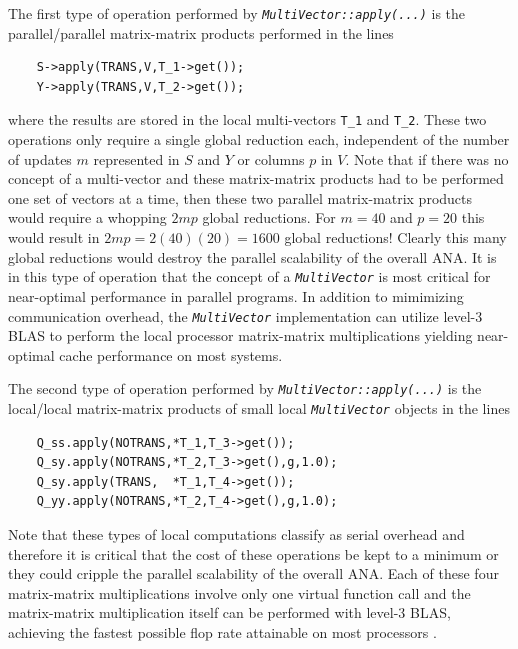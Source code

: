 The first type of operation performed by
\texttt{\textit{Multi\-Vector\-::apply(\-...)}} is the parallel/parallel
matrix-matrix products performed in the lines

{\scriptsize\begin{verbatim}
    S->apply(TRANS,V,T_1->get());
    Y->apply(TRANS,V,T_2->get());
\end{verbatim}}

\noindent where the results are stored in the local multi-vectors 
\texttt{T\_1} and \texttt{T\_2}.  These two operations only
require a single global reduction each, independent of the number of
updates $m$ represented in $S$ and $Y$ or columns $p$ in $V$.  Note
that if there was no concept of a multi-vector and these matrix-matrix
products had to be performed one set of vectors at a time, then these
two parallel matrix-matrix products would require a whopping $2 m p$
global reductions.  For $m = 40$ and $p = 20$ this would result in $2
m p = 2(40)(20) = 1600$ global reductions!  Clearly this many global
reductions would destroy the parallel scalability of the overall ANA.
It is in this type of operation that the concept of a
\texttt{\textit{Multi\-Vector}} is most critical for near-optimal
performance in parallel programs.  In addition to mimimizing
communication overhead, the \texttt{\textit{Multi\-Vector}}
implementation can utilize level-3 BLAS to perform the local processor
matrix-matrix multiplications yielding near-optimal cache performance
on most systems.

The second type of operation performed by
\texttt{\textit{Multi\-Vector\-::apply(\-...)}} is the local/local matrix-matrix
products of small local \texttt{\textit{Multi\-Vector}} objects in the
lines

{\scriptsize\begin{verbatim}
    Q_ss.apply(NOTRANS,*T_1,T_3->get());
    Q_sy.apply(NOTRANS,*T_2,T_3->get(),g,1.0);
    Q_sy.apply(TRANS,  *T_1,T_4->get());
    Q_yy.apply(NOTRANS,*T_2,T_4->get(),g,1.0);
\end{verbatim}}

\noindent Note that these types of local computations classify as serial
overhead and therefore it is critical that the cost of these
operations be kept to a minimum or they could cripple the parallel
scalability of the overall ANA.  Each of these four matrix-matrix
multiplications involve only one virtual function call and the
matrix-matrix multiplication itself can be performed with level-3
BLAS, achieving the fastest possible flop rate attainable on most
processors \cite{ref:demmel_1997}.

